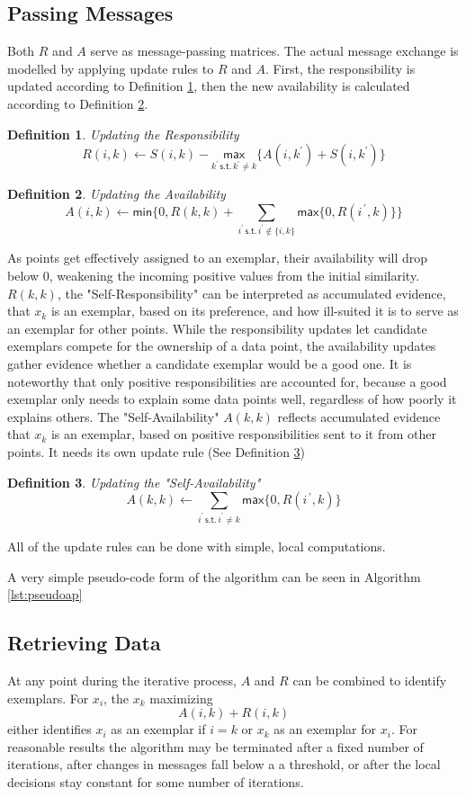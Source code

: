 \documentclass[11pt,a4paper]{article}
\newtheorem{definition}{Definition}
\begin{document}
\subsection{Passing Messages}
Both $R$ and $A$ serve as message-passing matrices. The actual message exchange is modelled by applying update rules to $R$ and $A$. First, the responsibility is updated according to Definition \ref{def:respupdate}, then the new availability is calculated according to Definition \ref{def:avupdate}.
\begin{definition}\label{def:respupdate}
	Updating the Responsibility
	\[
		R(i,k) \leftarrow S(i,k) - \underset{k^\prime\, \mathsf{s.t.}\, k^\prime \neq k}{\mathsf{max}} \{A(i,k^\prime) + S(i,k^\prime)\}
	\]
\end{definition}
\begin{definition}\label{def:avupdate}
	Updating the Availability
	\[
		A(i,k) \leftarrow \mathsf{min}\{0,R(k,k) + \sum\limits_{i^\prime\,\mathsf{s.t.}\, i^\prime \notin \{i,k\}}\mathsf{max}\{0, R(i^{\, \prime} ,k)\}\}
	\]
\end{definition}
As points get effectively assigned to an exemplar, their availability will drop below 0, weakening the incoming positive values from the initial similarity. $R(k,k)$, the "Self-Responsibility" can be interpreted as accumulated evidence, that $x_k$ is an exemplar, based on its preference, and how ill-suited it is to serve as an exemplar for other points. While the responsibility updates let candidate exemplars compete for the ownership of a data point, the availability updates gather evidence whether a candidate exemplar would be a good one. It is noteworthy that only positive responsibilities are accounted for, because a good exemplar only needs to explain some data points well, regardless of how poorly it explains others. \cite{frey2007clustering} The "Self-Availability" $A(k,k)$ reflects accumulated evidence that $x_k$ is an exemplar, based on positive responsibilities sent to it from other points. It needs its own update rule (See Definition \ref{def:savupdate})
\begin{definition}\label{def:savupdate}
	Updating the "Self-Availability"
	\[
		A(k,k) \leftarrow \sum\limits_{i^\prime\, \mathsf{s.t.}\, i^\prime \neq k} \mathsf{max} \{0, R(i^{\, \prime} ,k)\}
	\]
\end{definition}
All of the update rules can be done with simple, local computations.

A very simple pseudo-code form of the algorithm can be seen in Algorithm \ref{lst:pseudoap}
\subsection{Retrieving Data}
At any point during the iterative process, $A$ and $R$ can be combined to identify exemplars. For $x_i$, the $x_k$ maximizing
\[
	A(i,k) + R(i,k)
\]
either identifies $x_i$ as an exemplar if $i=k$ or $x_k$ as an exemplar for $x_i$. For reasonable results the algorithm may be terminated after a fixed number of iterations, after changes in messages fall below a a threshold, or after the local decisions stay constant for some number of iterations.
\end{document}
